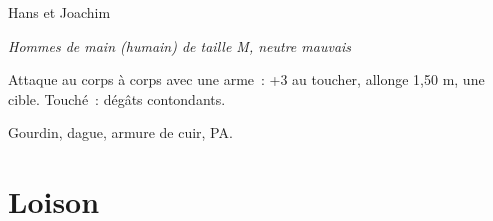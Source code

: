 \documentclass[a4paper,10pt,openany]{book}
\begin{document}
\begin{multicols}{2}
\begin{monsterbox}{Hans et Joachim}
	\begin{hangingpar}
		\textit{Hommes de main (humain) de taille M, neutre mauvais}
	\end{hangingpar}
	\dndline%
	\basics[%
	armorclass = 11 (armure de cuir),
	hitpoints  = \dice{2d8+2},
	speed      = 9 m
	]
	\dndline%
	\stats[
	STR = \stat{12},
	CON = \stat{12}
	]
	\dndline%
	\details[%
	senses= Perception passive 10,
	languages = {bas-thrain, vethrain},
	challenge= 1/8
	]
	\dndline%
	\begin{monsteraction}[Gourdin]
		Attaque au corps à corps avec une arme : +3 au toucher, allonge 1,50 m, une cible. Touché :  dégâts contondants.
	\end{monsteraction}
	\dndline%
	\begin{monsteraction}[Possessions]
		Gourdin, dague, armure de cuir,  PA.
	\end{monsteraction}
\end{monsterbox}

\end{multicols}

\chapter{Loison}
\end{document}
